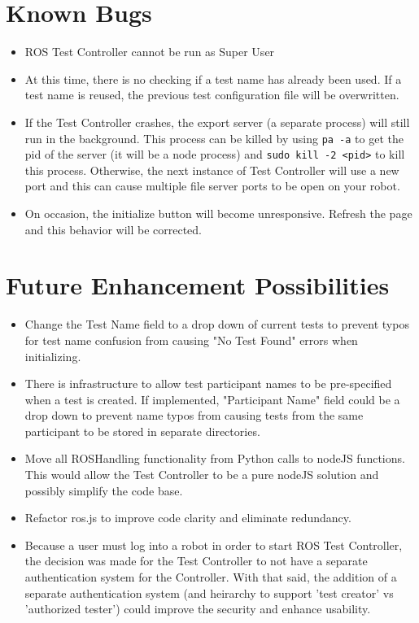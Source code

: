 \documentclass[onecolumn, draftclsnofoot,10pt, compsoc]{report}
\begin{document}
\section{Known Bugs}

\begin{itemize}
	\item ROS Test Controller cannot be run as Super User

	\item At this time, there is no checking if a test name has already been used. If a test name is reused, the previous test configuration file will be overwritten.

	\item If the Test Controller crashes, the export server (a separate process) will still run in the background. This process can be killed by using \texttt{pa -a} to get the pid of the server (it will be a node process) and \texttt{sudo kill -2 <pid>} to kill this process. Otherwise, the next instance of Test Controller will use a new port and this can cause multiple file server ports to be open on your robot.

	\item On occasion, the initialize button will become unresponsive. Refresh the page and this behavior will be corrected.
\end{itemize}

\section{Future Enhancement Possibilities}

\begin{itemize}
	\item Change the Test Name field to a drop down of current tests to prevent typos for test name confusion from causing "No Test Found" errors when initializing.

	\item There is infrastructure to allow test participant names to be pre-specified when a test is created. If implemented, "Participant Name" field could be a drop down to prevent name typos from causing tests from the same participant to be stored in separate directories.

	\item Move all ROSHandling functionality from Python calls to nodeJS functions. This would allow the Test Controller to be a pure nodeJS solution and possibly simplify the code base.

	\item Refactor ros.js to improve code clarity and eliminate redundancy.

	\item Because a user must log into a robot in order to start ROS Test Controller, the decision was made for the Test Controller to not have a separate authentication system for the Controller. With that said, the addition of a separate authentication system (and heirarchy to support 'test creator' vs 'authorized tester') could improve the security and enhance usability.
\end{itemize}
\end{document}
